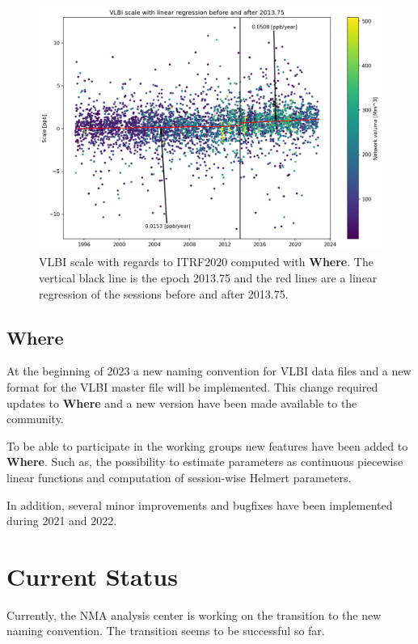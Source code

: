 \documentclass[twocolumn,twoside]{svmultivs_br} %
\begin{document}
\begin{figure}[htb!]         
  \begin{center}
  \includegraphics[width=16.0cm]{acnma02}
  \end{center}
  \caption{VLBI scale with regards to ITRF2020 computed with \textbf{Where}. The vertical black line is the epoch 2013.75 and
  the red lines are a linear regression of the sessions before and after 2013.75.}
  \label{fig:scale}             
\end{figure}  

\subsection{Where}
At the beginning of 2023 a new naming convention for VLBI data files and a new format for the VLBI master file
will be implemented. This change required updates to \textbf{Where} and a new version have been made available 
to the community. 

To be able to participate in the working groups new features have been added to \textbf{Where}. Such as, the 
possibility to estimate parameters as continuous piecewise linear functions and computation of session-wise Helmert
parameters. 

In addition, several minor improvements and bugfixes have been implemented during 2021 and 2022.
%
\section{Current Status}
%
Currently, the NMA analysis center is working on the transition to the new naming convention. The transition seems
to be successful so far. 
\end{document}
